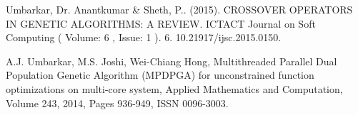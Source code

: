 
\newpage
\begin{thebibliography}{}
		
		 Umbarkar, Dr. Anantkumar \& Sheth, P.. (2015). CROSSOVER OPERATORS IN GENETIC ALGORITHMS: A REVIEW. ICTACT Journal on Soft Computing ( Volume: 6 , Issue: 1 ). 6. 10.21917/ijsc.2015.0150.
		
		 A.J. Umbarkar, M.S. Joshi, Wei-Chiang Hong,
		Multithreaded Parallel Dual Population Genetic Algorithm (MPDPGA) for unconstrained function optimizations on multi-core system,
		Applied Mathematics and Computation,
		Volume 243, 2014, Pages 936-949,
		ISSN 0096-3003.

		
		
		
		
	\end{thebibliography}

